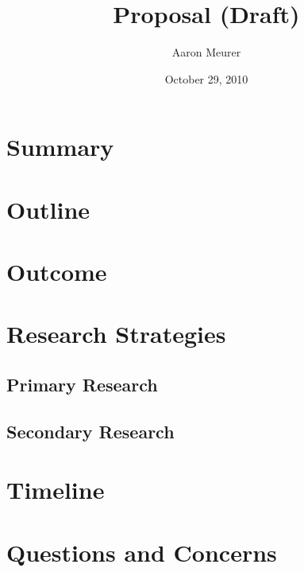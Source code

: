 \documentclass[12pt]{article}
\begin{document}
\title{Proposal (Draft)}
\author{Aaron Meurer}
\date{October 29, 2010}
\maketitle
\section{Summary}

\section{Outline}

\section{Outcome}

\section{Research Strategies}
\subsection{Primary Research}

\subsection{Secondary Research}

\section{Timeline}

\section{Questions and Concerns}
\end{document}
